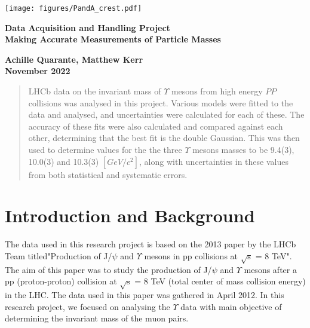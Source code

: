 \documentclass[A4sheet,12pt]{article}
\begin{document}
\pagestyle{empty}                       %

\par\noindent\texttt{[image: figures/PandA\_crest.pdf]}

\par\noindent                                           %
\vspace*{2cm}
\begin{center}
        \Large\bf \Large\bf Data Acquisition and Handling Project\\
        \LARGE\bf Making Accurate Measurements of Particle Masses
\end{center}
\vspace*{0.5cm}
\begin{center}
        \bf Achille Quarante, Matthew Kerr \\
        November 2022                            
\end{center}
\vspace*{5mm}
%
\begin{abstract}
        LHCb data on the invariant mass of $\Upsilon$ mesons from high energy $PP$ collisions was analysed in this project. Various models were fitted to the data and analysed, and uncertainties were calculated for each of these. The accuracy of these fits were also calculated and compared against each other, determining that the best fit is the double Gaussian. This was then used to determine values for the the three $\Upsilon$ mesons masses to be 9.4(3), 10.0(3) and 10.3(3) $[GeV/c^2]$, along with uncertainties in these values from both statistical and systematic errors.
\end{abstract}

\vspace*{1cm}


\vfill            

\newpage
%
\pagestyle{plain}                               %
\setcounter{page}{1}                            %
\tableofcontents                                %

\clearpage

\section*{Introduction and Background}
The data used in this research project is based on the 2013 paper by the LHCb Team titled"Production of J/$\psi$ and $\Upsilon$ mesons in pp collisions at $\sqrt{\text{s}}$ = 8 TeV"\cite{origpaper}. The aim of this paper was to study the production of J/$\psi$ and $\Upsilon$ mesons after a pp (proton-proton) collision at $\sqrt{\text{s}}$ = 8 TeV (total center of mass collision energy) in the LHC. The data used in this paper was gathered in April 2012. In this research project, we focused on analysing the $\Upsilon$ data with main objective of determining the invariant mass of the muon pairs.\\
\end{document}
